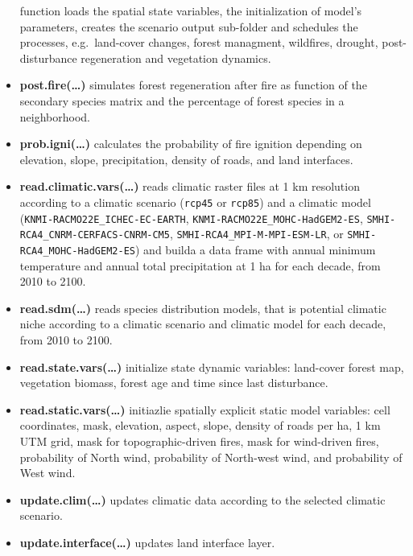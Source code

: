 \documentclass[
]{article}
\begin{document}
\begin{itemize}
  function loads the spatial state variables, the initialization of
  model's parameters, creates the scenario output sub-folder and
  schedules the processes, e.g.~land-cover changes, forest managment,
  wildfires, drought, post-disturbance regeneration and vegetation
  dynamics.\\
\item
  \textbf{post.fire(\ldots{})} simulates forest regeneration after fire
  as function of the secondary species matrix and the percentage of
  forest species in a neighborhood.\\
\item
  \textbf{prob.igni(\ldots{})} calculates the probability of fire
  ignition depending on elevation, slope, precipitation, density of
  roads, and land interfaces.\\
\item
  \textbf{read.climatic.vars(\ldots{})} reads climatic raster files at 1
  km resolution according to a climatic scenario (\texttt{rcp45} or
  \texttt{rcp85}) and a climatic model
  (\texttt{KNMI-RACMO22E\_ICHEC-EC-EARTH},
  \texttt{KNMI-RACMO22E\_MOHC-HadGEM2-ES},
  \texttt{SMHI-RCA4\_CNRM-CERFACS-CNRM-CM5},
  \texttt{SMHI-RCA4\_MPI-M-MPI-ESM-LR}, or
  \texttt{SMHI-RCA4\_MOHC-HadGEM2-ES}) and builda a data frame with
  annual minimum temperature and annual total precipitation at 1 ha for
  each decade, from 2010 to 2100.\\
\item
  \textbf{read.sdm(\ldots{})} reads species distribution models, that is
  potential climatic niche according to a climatic scenario and climatic
  model for each decade, from 2010 to 2100.\\
\item
  \textbf{read.state.vars(\ldots{})} initialize state dynamic variables:
  land-cover forest map, vegetation biomass, forest age and time since
  last disturbance.\\
\item
  \textbf{read.static.vars(\ldots{})} initiazlie spatially explicit
  static model variables: cell coordinates, mask, elevation, aspect,
  slope, density of roads per ha, 1 km UTM grid, mask for
  topographic-driven fires, mask for wind-driven fires, probability of
  North wind, probability of North-west wind, and probability of West
  wind.\\
\item
  \textbf{update.clim(\ldots{})} updates climatic data according to the
  selected climatic scenario.\\
\item
  \textbf{update.interface(\ldots{})} updates land interface layer.
\end{itemize}
\end{document}
